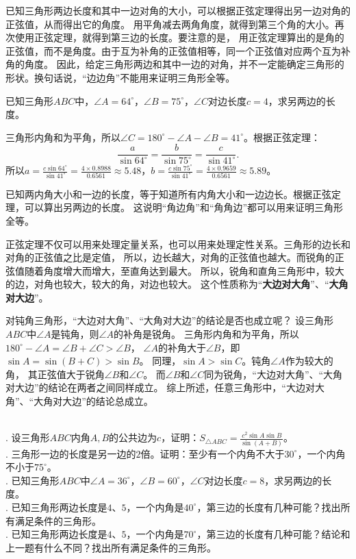\documentclass[12pt,UTF8,fontset=none]{ctexbook}
\begin{document}
已知三角形两边长度和其中一边对角的大小，可以根据正弦定理得出另一边对角的正弦值，从而得出它的角度。
用平角减去两角角度，就得到第三个角的大小。再次使用正弦定理，就得到第三边的长度。要注意的是，
用正弦定理算出的是角的正弦值，而不是角度。由于互为补角的正弦值相等，同一个正弦值对应两个互为补角的角度。
因此，给定三角形两边和其中一边的对角，并不一定能确定三角形的形状。换句话说，“边边角”不能用来证明三角形全等。

\begin{ex}\label{ex:2-1-20}
    已知三角形$ABC$中，$\angle A = 64^\circ$，$\angle B = 75^\circ$，$\angle C$对边长度$c=4$，求另两边的长度。
\end{ex}
\begin{so}
    三角形内角和为平角，所以$\angle C = 180^\circ - \angle A - \angle B = 41^\circ$。根据正弦定理：
    $$ \frac{a}{\sin 64^\circ} = \frac{b}{\sin 75^\circ} = \frac{c}{\sin 41^\circ}.$$
    所以$a = \frac{c \sin 64^\circ}{\sin 41^\circ} = \frac{4 \times 0.8988}{0.6561} \approx 5.48 $，$b = \frac{c \sin 75^\circ}{\sin 41^\circ} = \frac{4 \times 0.9659}{0.6561} \approx 5.89 $。
\end{so}

已知两内角大小和一边的长度，等于知道所有内角大小和一边边长。根据正弦定理，可以算出另两边的长度。
这说明“角边角”和“角角边”都可以用来证明三角形全等。

正弦定理不仅可以用来处理定量关系，也可以用来处理定性关系。三角形的边长和对角的正弦值之比是定值，
所以，边长越大，对角的正弦值也越大。而锐角的正弦值随着角度增大而增大，至直角达到最大。
所以，锐角和直角三角形中，较大的边，对角也较大，较大的角，对边也较大。
这个性质称为“\textbf{大边对大角}”、“\textbf{大角对大边}”。

对钝角三角形，“大边对大角”、“大角对大边”的结论是否也成立呢？
设三角形$ABC$中$\angle A$是钝角，则$\angle A$的补角是锐角。
三角形内角和为平角，所以$180^\circ - \angle A = \angle B + \angle C > \angle B$，
$\angle A$的补角大于$\angle B$，即$\sin A = \sin (B + C) > \sin B$。
同理，$\sin A > \sin C$。钝角$\angle A$作为较大的角，
其正弦值大于锐角$\angle B$和$\angle C$。
而$\angle B$和$\angle C$同为锐角，“大边对大角”、“大角对大边”的结论在两者之间同样成立。
综上所述，任意三角形中，“大边对大角”、“大角对大边”的结论总成立。

\begin{xt}\label{xt:2-1-10}
    \mbox{} \\
    . 设三角形$ABC$内角$A,B$的公共边为$c$，证明：$S_{\triangle ABC} = \frac{c^2\sin A\sin B}{\sin (A+B)}$。 \\
    . 三角形一边的长度是另一边的$2$倍。证明：至少有一个内角不大于$30^\circ$，一个内角不小于$75^\circ$。 \\
    . 已知三角形$ABC$中$\angle A = 36^\circ$，$\angle B = 60^\circ$，$\angle C$对边长度$c = 8$，求另两边的长度。 \\
    . 已知三角形两边长度是$4$、$5$，一个内角是$40^\circ$，第三边的长度有几种可能？找出所有满足条件的三角形。 \\
    . 已知三角形两边长度是$4$、$5$，一个内角是$70^\circ$，第三边的长度有几种可能？结论和上一题有什么不同？找出所有满足条件的三角形。
\end{xt}
\end{document}
